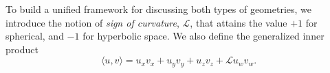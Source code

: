 To build a unified framework for discussing both types of geometries, we introduce the notion of \textit{sign of curvature}, $\mathcal{L}$, that attains the value $+1$ for spherical, and $-1$ for hyperbolic space.
We also define the generalized inner product
\begin{equation} \label{eq:gen-inner-prod}
    \langle u, v \rangle = u_xv_x + u_yv_y + u_zv_z + \mathcal{L}u_wv_w.
\end{equation}

